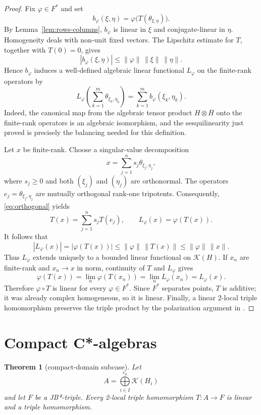 \documentclass[11pt]{article}
\newtheorem{theorem}{Theorem}[section]
\theoremstyle{remark}
\newcommand{\K}{\mathcal K}
\newcommand{\czerosum}{\mathop{\bigoplus}\limits^{c_0}}
\begin{document}
\begin{proof}
Fix $\varphi\in F^*$ and set
\[
 b_\varphi(\xi,\eta)
   =\varphi\bigl(T(\theta_{\xi,\eta})\bigr).
\]
By Lemma~\ref{lem:rows-columns}, $b_\varphi$ is linear in $\xi$ and
conjugate-linear in $\eta$.  Homogeneity deals with non-unit fixed vectors.
The Lipschitz estimate for $T$, together with $T(0)=0$, gives
\begin{equation}\label{eq:b-bound}
 |b_\varphi(\xi,\eta)|
 \leq \|\varphi\|\,\|\xi\|\,\|\eta\|.
\end{equation}
Hence $b_\varphi$ induces a well-defined algebraic linear functional
$L_\varphi$ on the finite-rank operators by
\[
 L_\varphi\left(\sum_{k=1}^m\theta_{\xi_k,\eta_k}\right)
   =\sum_{k=1}^m b_\varphi(\xi_k,\eta_k).
\]
Indeed, the canonical map from the algebraic tensor product
$H\otimes\overline H$ onto the finite-rank operators is an algebraic
isomorphism, and the sesquilinearity just proved is precisely the balancing
needed for this definition.

Let $x$ be finite-rank.  Choose a singular-value decomposition
\[
 x=\sum_{j=1}^n s_j\theta_{\xi_j,\eta_j},
\]
where $s_j\geq0$ and both $(\xi_j)$ and $(\eta_j)$ are orthonormal.  The
operators $e_j=\theta_{\xi_j,\eta_j}$ are mutually orthogonal rank-one
tripotents.  Consequently, \eqref{eq:orthogonal} yields
\[
 T(x)=\sum_{j=1}^n s_jT(e_j),
 \qquad
 L_\varphi(x)=\varphi(T(x)).
\]
It follows that
\begin{equation}\label{eq:operator-bound}
 |L_\varphi(x)|
   =|\varphi(T(x))|
   \leq\|\varphi\|\,\|T(x)\|
   \leq\|\varphi\|\,\|x\|.
\end{equation}
Thus $L_\varphi$ extends uniquely to a bounded linear functional on
$\K(H)$.  If $x_n$ are finite-rank and $x_n\to x$ in norm, continuity of
$T$ and $L_\varphi$ gives
\[
 \varphi(T(x))=\lim_n\varphi(T(x_n))
              =\lim_nL_\varphi(x_n)=L_\varphi(x).
\]
Therefore $\varphi\circ T$ is linear for every $\varphi\in F^*$.  Since
$F^*$ separates points, $T$ is additive; it was already complex homogeneous,
so it is linear.  Finally, a linear 2-local triple homomorphism preserves the
triple product by the polarization argument in
\cite[Section 2]{BurgosEtAl}.
\end{proof}

\section{Compact C*-algebras}

\begin{theorem}[compact-domain subcase]\label{thm:compact}
Let
\[
 A=\czerosum_{i\in I}\K(H_i)
\]
and let $F$ be a JB*-triple.  Every 2-local triple homomorphism
$T:A\to F$ is linear and a triple homomorphism.
\end{theorem}
\end{document}
